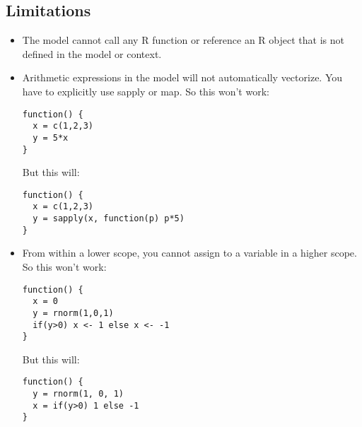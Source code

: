 \documentclass[12pt]{article}
\begin{document}
\subsection{Limitations}
\begin{itemize}
\item The model cannot call any R function or reference an R object that is not defined in the model or context. 
\item Arithmetic expressions in the model will not automatically vectorize. You have to explicitly use sapply or map. So this won't work:
\lstset{language=R}
\begin{lstlisting}
function() {
  x = c(1,2,3)
  y = 5*x
}
\end{lstlisting}

But this will:
\begin{lstlisting}
function() {
  x = c(1,2,3)
  y = sapply(x, function(p) p*5)
}

\end{lstlisting}
\item From within a lower scope, you cannot assign to a variable in a higher scope. So this won't work:
\begin{lstlisting}
function() {
  x = 0
  y = rnorm(1,0,1)
  if(y>0) x <- 1 else x <- -1
}
\end{lstlisting}
But this will:
\begin{lstlisting}
function() {
  y = rnorm(1, 0, 1)
  x = if(y>0) 1 else -1
}
\end{lstlisting}
\end{itemize}
\end{document}
